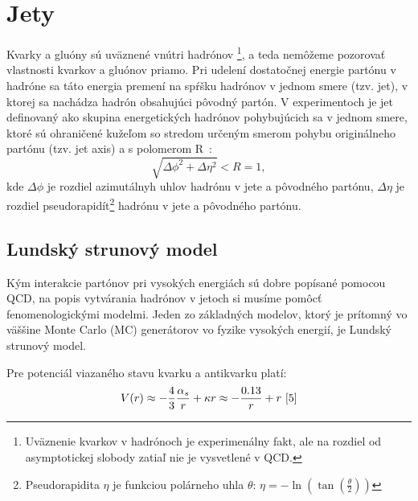 \documentclass[thesismargins, thesislinespacing]{rnthesis}
\begin{document}
\section{Jety}

Kvarky a gluóny sú uväznené vnútri hadrónov \footnote{Uväznenie kvarkov v hadrónoch je experimenálny fakt, ale na rozdiel od asymptotickej slobody zatiaľ nie je vysvetlené v QCD.}, a teda nemôžeme pozorovať vlastnosti kvarkov a gluónov priamo. Pri udelení dostatočnej energie partónu v hadróne sa táto energia premení na spŕšku hadrónov v jednom smere (tzv. jet), v ktorej sa nachádza hadrón obsahujúci pôvodný partón. V experimentoch je jet definovaný ako skupina energe\-tických hadrónov pohybujúcich sa v jednom smere, ktoré sú ohraničené kužeľom so stredom určeným smerom pohybu originálneho partónu (tzv. jet axis) a s polomerom R~\cite{4}:
\begin{equation}
\sqrt{\Delta \phi^2 + \Delta \eta^2}<R=1,
\end{equation}
kde $\Delta \phi$ je rozdiel azimutálnyh uhlov hadrónu v jete a pôvodného partónu, $\Delta \eta$ je rozdiel pseudorapidít\footnote{Pseudorapidita $\eta$ je funkciou polárneho uhla $\theta$: $\eta = - \ln( \tan (\frac{\theta}{2}))$} hadrónu v jete a pôvodného partónu.
\subsection{Lundský strunový model}
Kým interakcie partónov pri vysokých energiách sú dobre popísané pomocou QCD, na popis vytvárania hadrónov v jetoch si musíme pomôcť fenomenologickými \-mo\-del\-mi. Jeden zo základných modelov, ktorý je prítomný vo väššine Monte Carlo (MC) generátorov vo fyzike vysokých energií, je Lundský strunový model.

Pre potenciál viazaného stavu kvarku a antikvarku platí:
\begin{equation}
	V(r) \approx - \frac{4}{3} \frac{\alpha_s}{r} + \kappa r \approx - \frac{0.13}{r} + r~\cite{5}
\end{equation}
\end{document}
